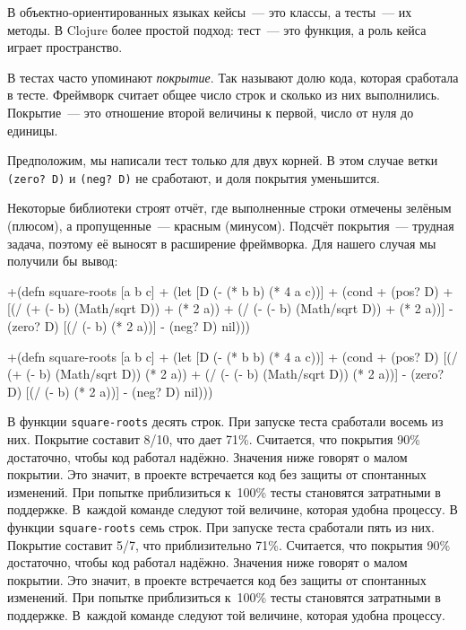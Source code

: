 В объектно-ориентированных языках кейсы~--- это классы, а тесты~--- их методы. В
Clojure более простой подход: тест~--- это функция, а роль кейса играет
пространство.


В тестах часто упоминают \emph{покрытие}. Так называют долю кода, которая
сработала в тесте. Фреймворк считает общее число строк и сколько из них
выполнились. Покрытие~--- это отношение второй величины к первой, число от нуля
до единицы.

Предположим, мы написали тест только для двух корней. В этом случае ветки
\verb|(zero? D)| и \verb|(neg? D)| не сработают, и доля покрытия уменьшится.

Некоторые библиотеки строят отчёт, где выполненные строки отмечены зелёным
(плюсом), а пропущенные~--- красным (минусом). Подсчёт покрытия~--- трудная
задача, поэтому её выносят в расширение фреймворка. Для нашего случая мы
получили бы вывод:

\ifnarrow

\begin{english}
  \begin{diff}
+(defn square-roots [a b c]
+  (let [D (- (* b b) (* 4 a c))]
+    (cond
+      (pos? D)
+      [(/ (+ (- b) (Math/sqrt D))
+          (* 2 a))
+       (/ (- (- b) (Math/sqrt D))
+          (* 2 a))]
-      (zero? D) [(/ (- b) (* 2 a))]
-      (neg? D) nil)))
  \end{diff}
\end{english}

\else

\begin{english}
  \begin{diff}
+(defn square-roots [a b c]
+  (let [D (- (* b b) (* 4 a c))]
+    (cond
+      (pos? D) [(/ (+ (- b) (Math/sqrt D)) (* 2 a))
+                (/ (- (- b) (Math/sqrt D)) (* 2 a))]
-      (zero? D) [(/ (- b) (* 2 a))]
-      (neg? D) nil)))
  \end{diff}
\end{english}
\fi

\ifnarrow

\def\covperc{80\%}

\else

\def\covperc{71\%}

\fi

\ifnarrow
В функции \verb|square-roots| десять строк. При запуске теста сработали восемь из
них. Покрытие составит 8/10, что дает \covperc. Считается, что покрытия
90\% достаточно, чтобы код работал надёжно. Значения ниже говорят о малом
покрытии. Это значит, в проекте встречается код без защиты от спонтанных
изменений. При попытке приблизиться к~100\% тесты становятся затратными в
поддержке. В~каждой команде следуют той величине, которая удобна процессу.
\else
В функции \verb|square-roots| семь строк. При запуске теста сработали пять из
них. Покрытие составит 5/7, что приблизительно \covperc. Считается, что покрытия
90\% достаточно, чтобы код работал надёжно. Значения ниже говорят о малом
покрытии. Это значит, в проекте встречается код без защиты от спонтанных
изменений. При попытке приблизиться к~100\% тесты становятся затратными в
поддержке. В~каждой команде следуют той величине, которая удобна процессу.
\fi

